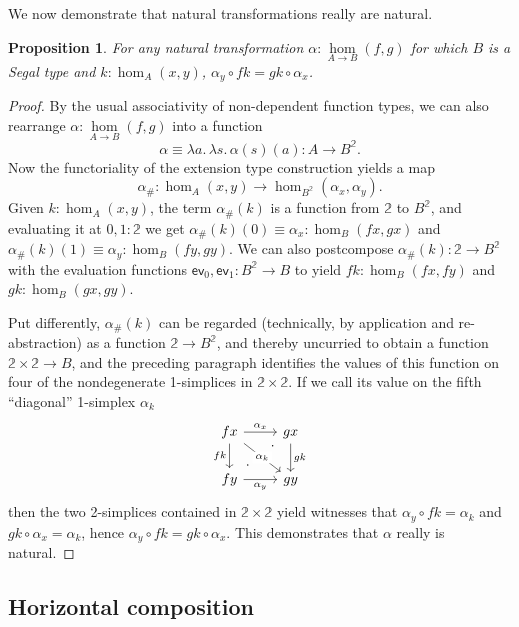 \documentclass[12pt]{amsart}
\theoremstyle{plain}
\newtheorem{prop}[thm]{Proposition}
\theoremstyle{definition}
\theoremstyle{remark}
\numberwithin{equation}{section}
\newcommand{\extfn}[1]{{#1}_\#}
\newcommand{\jdeq}{\equiv}
\def\nat#1#2{\underset{#1\to#2}{\hom}}
\newcommand{\lam}[1]{\lambda #1.\,}
\newcommand{\extapp}[2]{{#1}({#2})}
\newcommand{\two}{\mathbb{2}}
\begin{document}
We now demonstrate that natural transformations really are natural.

\begin{prop}\label{prop:nat-are-nat} For any natural transformation $\alpha : \nat AB(f,g)$ for which $B$ is a Segal type and $k : \hom_A(x,y)$, $\alpha_y \circ fk = gk \circ \alpha_x$. 
\end{prop}
\begin{proof}
By the usual associativity of non-dependent function types, we can also rearrange $\alpha : \nat AB(f,g)$ into a function
\[ \alpha \jdeq \lam{a}\lam{s}\extapp{\alpha}{s}(a) : A \to B^\two.\]
Now the functoriality of the extension type construction yields a map
\[ \extfn\alpha : \hom_A(x,y) \to \hom_{B^\two}(\alpha_x,\alpha_y).\]
Given $k :\hom_A(x,y)$, the term $\extfn\alpha(k)$ is a function from $\two$ to $B^\two$, and evaluating it at $0,1:\two$ we get $\extfn\alpha(k)(0) \jdeq \alpha_x : \hom_{B}(fx,gx)$ and $\extfn\alpha(k)(1)\jdeq\alpha_y : \hom_{B}(fy,gy)$.
We can also postcompose $\extfn\alpha(k) : \two \to B^\two$ with the evaluation functions $\mathsf{ev}_0, \mathsf{ev}_1 : B^\two \to B$ to yield $fk : \hom_{B}(fx,fy)$ and $gk : \hom_{B}(gx,gy)$.

Put differently, $\extfn\alpha(k)$ can be regarded (technically, by application and re-ab\-stract\-ion) as a function $\two \to B^\two$, and thereby uncurried to obtain a function $\two\times \two \to B$, and the preceding paragraph identifies the values of this function on four of the nondegenerate 1-simplices in $\two\times\two$.
If we call its value on the fifth ``diagonal'' 1-simplex $\alpha_k$
\[
\begin{tikzcd}
fx \arrow[r, "\alpha_x"] \arrow[dr, "\alpha_k" description] \arrow[d, "fk"'] & gx \arrow[d, "gk"] \\ fy \arrow[r, "\alpha_y"']  \arrow[ur, phantom, "\cdot" very near start, "\cdot" very near end] & gy
\end{tikzcd}
\]
then the two 2-simplices contained in $\two\times\two$ yield witnesses that $\alpha_y \circ fk = \alpha_k$ and $gk \circ \alpha_x = \alpha_k$, hence $\alpha_y \circ fk = gk \circ \alpha_x$. This demonstrates that $\alpha$ really is natural.
\end{proof}

\subsection{Horizontal composition}
\label{sec:horiz}
\end{document}
